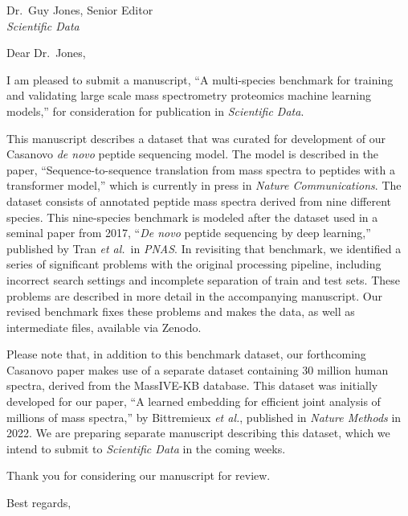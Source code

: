 \documentclass[12pt]{letter}
\begin{document}
\begin{letter}{Dr.\ Guy Jones, Senior Editor \\
{\em Scientific Data}}

\opening{Dear Dr.\ Jones,}

I am pleased to submit a manuscript, ``A multi-species benchmark for training and validating large scale mass spectrometry proteomics machine learning models,'' for consideration for publication in {\em Scientific Data}.

This manuscript describes a dataset that was curated for development of our Casanovo {\em de novo} peptide sequencing model.
The model is described in the paper, ``Sequence-to-sequence translation from mass spectra to peptides with a transformer model,'' which is currently in press in {\em Nature Communications}.
The dataset consists of annotated peptide mass spectra derived from nine different species.
This nine-species benchmark is modeled after the dataset used in a seminal paper from 2017, ``{\em De novo} peptide sequencing by deep learning,'' published by Tran {\em et al.}\ in {\em PNAS}.
In revisiting that benchmark, we identified a series of significant problems with the original processing pipeline, including incorrect search settings and incomplete separation of train and test sets.
These problems are described in more detail in the accompanying manuscript.
Our revised benchmark fixes these problems and makes the data, as well as intermediate files, available via Zenodo.

Please note that, in addition to this benchmark dataset, our forthcoming Casanovo paper makes use of a separate dataset containing 30 million human spectra, derived from the MassIVE-KB database.
This dataset was initially developed for our paper, ``A learned embedding for efficient joint analysis of millions of mass spectra,'' by Bittremieux {\em et al.}, published in {\em Nature Methods} in 2022.
We are preparing separate manuscript describing this dataset, which we intend to submit to {\em Scientific Data} in the coming weeks.

Thank you for considering our manuscript for review.

\closing{Best regards,}
\end{letter}
\end{document}
